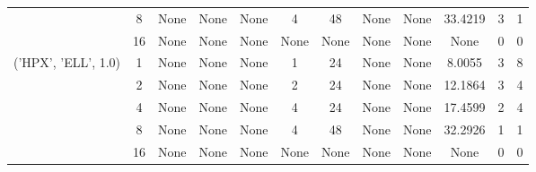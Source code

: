 \begin{tabular}{cccccccccccc}
& 8& None& None& None& 4& 48& None& None& 33.4219& 3& 1\\
& 16& None& None& None& None& None& None& None& None& 0& 0\\
\hline
\multirow{5}{*}{('HPX', 'ELL', 1.0)}& 1& None& None& None& 1& 24& None& None& 8.0055& 3& 8\\
& 2& None& None& None& 2& 24& None& None& 12.1864& 3& 4\\
& 4& None& None& None& 4& 24& None& None& 17.4599& 2& 4\\
& 8& None& None& None& 4& 48& None& None& 32.2926& 1& 1\\
& 16& None& None& None& None& None& None& None& None& 0& 0\\
\hline
\end{tabular}
